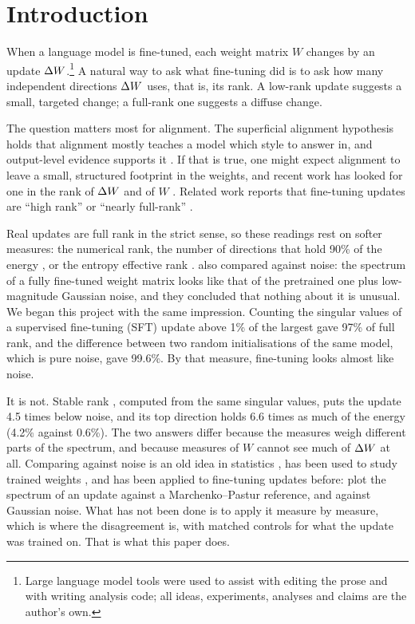 \section{Introduction}
\label{sec:intro}

When a language model is fine-tuned, each weight matrix $W$ changes by an
update $\Delta W$.\footnote{Large language model tools were used to assist with
editing the prose and with writing analysis code; all ideas, experiments,
analyses and claims are the author's own.} A natural way to ask what fine-tuning did is to ask how many
independent directions $\Delta W$ uses, that is, its rank. A low-rank update
suggests a small, targeted change; a full-rank one suggests a diffuse change.

The question matters most for alignment. The superficial alignment hypothesis
\citep{zhou2023lima} holds that alignment mostly teaches a model which style
to answer in, and output-level evidence supports it \citep{lin2024urial}. If
that is true, one might expect alignment to leave a small, structured
footprint in the weights, and recent work has looked for one in the rank of
$\Delta W$ and of $W$ \citep{wu2025timber}. Related work reports that fine-tuning
updates are ``high rank'' \citep{biderman2024lora} or ``nearly full-rank''
\citep{mukherjee2025rl}.

Real updates are full rank in the strict sense, so these readings rest on
softer measures: the numerical rank, the number of directions that hold 90\%
of the energy \citep{biderman2024lora}, or the entropy effective rank
\citep{roy2007effective, wu2025timber}. \citet{biderman2024lora} also compared
against noise: the spectrum of a fully fine-tuned weight matrix looks like that
of the pretrained one plus low-magnitude Gaussian noise, and they concluded
that nothing about it is unusual. We began this project with the same
impression. Counting the singular values of a supervised fine-tuning (SFT)
update above 1\% of the
largest gave 97\% of full rank, and the difference between two random
initialisations of the same model, which is pure noise, gave 99.6\%. By that
measure, fine-tuning looks almost like noise.

It is not. Stable rank \citep{rudelson2007sampling}, computed from the same
singular values, puts the update 4.5 times below noise, and its top direction
holds 6.6 times as much of the energy (4.2\% against 0.6\%). The two answers
differ because the
measures weigh different parts of the spectrum, and because measures of $W$
cannot see much of $\Delta W$ at all. Comparing against noise is an old idea in
statistics \citep{horn1965parallel, gavish2014optimal}, has been used to
study trained weights \citep{martin2021implicit, thamm2022random}, and has
been applied to fine-tuning updates before: \citet{ryu2023efficient} plot the
spectrum of an update against a Marchenko--Pastur reference, and
\citet{biderman2024lora} against Gaussian noise. What has not been done is to
apply it measure by measure, which is where the disagreement is, with matched
controls for what the update was trained on. That is what this paper does.

